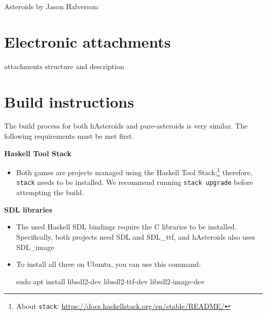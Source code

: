 \documentclass[
  digital, %
  color,   %
  table,   %
  oneside, %
  lof,     %
  lot,     %
]{fithesis3}
\begin{document}
{Asteroids by Jason Halverson:



\chapter{Electronic attachments}
attachments structure and description


\chapter{Build instructions}
The build process for both hAsteroids and pure-asteroids is very similar.
The following requirements must be met first.
\newcommand{\requirementitem}[1]{\noindent\textbf{#1}}

\medskip
\requirementitem{Haskell Tool Stack}
\begin{itemize}[\indent]
    \item Both games are projects managed using the Haskell Tool Stack;\footnote{
    About \texttt{stack}: \url{https://docs.haskellstack.org/en/stable/README/}
    } therefore, \texttt{stack} needs to be installed.
    We recommend running \texttt{stack upgrade} before attempting the build.
\end{itemize}

\requirementitem{SDL libraries}
\begin{itemize}[\indent]
    \item The used Haskell SDL bindings require the C libraries to be installed.
    Specifically, both projects need SDL and SDL\_ttf, and hAsteroids also uses SDL\_image 
    \item To install all three on Ubuntu, you can use this command:
    \begin{term}
    sudo apt install libsdl2-dev libsdl2-ttf-dev libsdl2-image-dev
    \end{term}
    

\end{itemize}}
\end{document}
